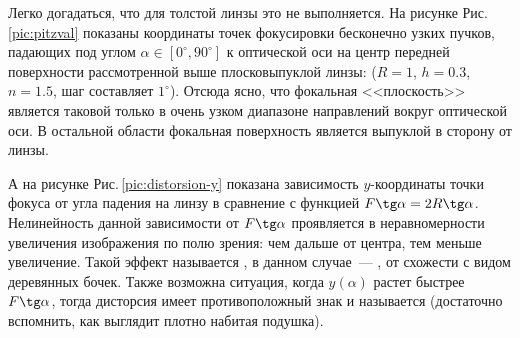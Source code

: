 Легко догадаться, что для толстой линзы это не выполняется. На рисунке Рис.\,\ref{pic:pitzval} показаны координаты точек фокусировки бесконечно узких пучков, падающих под углом $\alpha \in [0^\circ, 90^\circ]$ к оптической оси на центр передней поверхности рассмотренной выше плосковыпуклой линзы: ($R = 1$, $h = 0.3$, $n=1.5$, шаг составляет $1^\circ$). Отсюда ясно, что фокальная <<плоскость>> является таковой только в очень узком диапазоне направлений вокруг оптической оси. В остальной области фокальная поверхность является выпуклой в сторону от линзы.

  А на рисунке Рис.\,\ref{pic:distorsion-y} показана зависимость $y$-координаты точки фокуса от угла падения на линзу в сравнение с функцией $F \tg \alpha = 2R \tg \alpha$. Нелинейность данной зависимости от $F \tg \alpha$ проявляется в неравномерности увеличения изображения по полю зрения: чем дальше от центра, тем меньше увеличение. Такой эффект называется , в данном случае~--- , от схожести с видом деревянных бочек. Также возможна ситуация, когда $y(\alpha)$ растет быстрее $F \tg \alpha$, тогда дисторсия имеет противоположный знак и называется  (достаточно вспомнить, как выглядит плотно набитая подушка).
  
